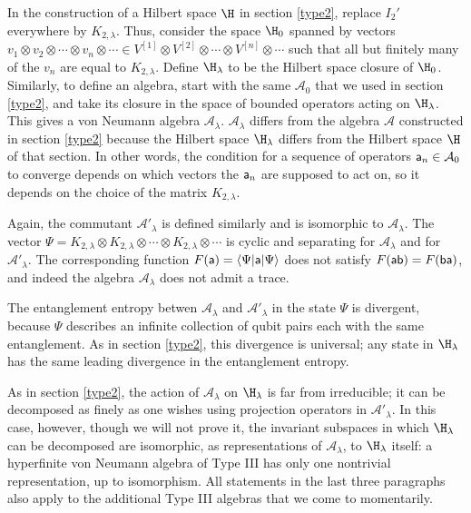 \documentclass[12pt]{article}
\def\a{{\sf a}}
\def\b{{\sf b}}
\def\nn{{[n]}}
\def\oone{{[1]}}
\def\ttwo{{[2]}}
\def\ra{\rangle}
\def\la{\langle}
\numberwithin{equation}{section}
\def\A{{\mathcal A}}
\begin{document}
In the construction of a Hilbert space $\H$ in section \ref{type2}, replace $I_2'$ everywhere by $K_{2,\lambda}$.
Thus, consider the space $\H_0$ spanned by vectors $v_1\otimes v_2\otimes \cdots \otimes v_n\otimes \cdots\in
V^\oone\otimes V^\ttwo \otimes \cdots \otimes V^\nn\otimes \cdots$ such that all but finitely many of the
$v_n$ are equal to $K_{2,\lambda}$.  Define $\H_\lambda$ to be the Hilbert space closure of $\H_0$.
Similarly, to define an algebra, start with the same $\A_0$ that we used in section \ref{type2}, and take
its closure in the space of bounded operators acting on $\H_\lambda$.  This gives a von Neumann algebra
$\A_\lambda$.  $\A_\lambda$ differs from the algebra $\A$ constructed in section \ref{type2} because the Hilbert
space $\H_\lambda$ differs from the Hilbert space $\H$ of that section.  In other words, the condition for a sequence
of operators $\a_n\in\A_0$ to converge depends on which vectors the $\a_n$ are supposed to act on, so it
depends on the choice of the matrix $K_{2,\lambda}$.

Again, the commutant $\A'_\lambda$ is defined similarly and is isomorphic to $\A_\lambda$.
The vector $\Psi=K_{2,\lambda}\otimes K_{2,\lambda}\otimes \cdots \otimes K_{2,\lambda}\otimes \cdots$
is cyclic and separating for $\A_\lambda$ and for $\A'_\lambda$.   The corresponding function 
$F(\a)=\la\Psi|\a|\Psi\ra$ does not satisfy $F(\a\b)=F(\b\a)$, and indeed the algebra $\A_\lambda$
does not admit a trace.   

The entanglement entropy betwen $\A_\lambda$ and $\A'_\lambda$ in the state $\Psi$ is divergent,
because $\Psi$ describes an infinite collection of qubit pairs each with the same entanglement.  As
in section \ref{type2},  this divergence is universal; any state in $\H_\lambda$ has the same leading divergence
in the entanglement entropy.

As in section \ref{type2}, the action of $\A_\lambda$ on $\H_\lambda$ is far from irreducible; it can be decomposed
as finely as one wishes 
using projection
operators in $\A'_\lambda$. 
In this case, however, though we will not prove it, the invariant subspaces in which $\H_\lambda$ can be decomposed
are isomorphic, as representations of $\A_\lambda$, to $\H_\lambda$ itself:
a hyperfinite von Neumann algebra of Type III  has only one nontrivial
 representation, up to isomorphism.   All statements in the last three paragraphs also apply to the additional  Type III algebras  that we come to momentarily.
\end{document}

